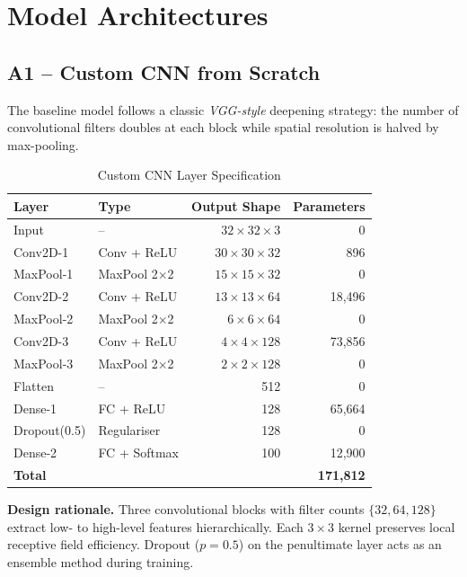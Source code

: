 \documentclass[12pt,a4paper]{article}
\begin{document}
\section{Model Architectures}

\subsection{A1 -- Custom CNN from Scratch}

The baseline model follows a classic \emph{VGG-style} deepening strategy: the number of convolutional filters doubles at each block while spatial resolution is halved by max-pooling.

\begin{table}[H]
\centering
\caption{Custom CNN Layer Specification}
\begin{tabular}{llrr}
\toprule
\textbf{Layer} & \textbf{Type} & \textbf{Output Shape} & \textbf{Parameters} \\
\midrule
Input          & --           & $32\times32\times3$   & 0 \\
Conv2D-1       & Conv + ReLU  & $30\times30\times32$  & 896 \\
MaxPool-1      & MaxPool 2$\times$2 & $15\times15\times32$ & 0 \\
Conv2D-2       & Conv + ReLU  & $13\times13\times64$  & 18{,}496 \\
MaxPool-2      & MaxPool 2$\times$2 & $6\times6\times64$   & 0 \\
Conv2D-3       & Conv + ReLU  & $4\times4\times128$   & 73{,}856 \\
MaxPool-3      & MaxPool 2$\times$2 & $2\times2\times128$  & 0 \\
Flatten        & --           & 512                   & 0 \\
Dense-1        & FC + ReLU    & 128                   & 65{,}664 \\
Dropout(0.5)   & Regulariser  & 128                   & 0 \\
Dense-2        & FC + Softmax & 100                   & 12{,}900 \\
\midrule
\textbf{Total} & & & \textbf{171{,}812} \\
\bottomrule
\end{tabular}
\end{table}

\textbf{Design rationale.} Three convolutional blocks with filter counts $\{32, 64, 128\}$ extract low- to high-level features hierarchically. Each $3\times3$ kernel preserves local receptive field efficiency. Dropout ($p = 0.5$) on the penultimate layer acts as an ensemble method during training.
\end{document}
